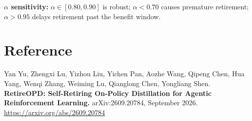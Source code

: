 \documentclass[10pt,twocolumn]{article}
\begin{document}
\textbf{$\alpha$ sensitivity:} $\alpha \in [0.80, 0.90]$ is robust;
$\alpha < 0.70$ causes premature retirement; $\alpha > 0.95$ delays
retirement past the benefit window.

\section*{Reference}

Yan Yu, Zhengxi Lu, Yizhou Liu, Yichen Pan, Aozhe Wang, Qipeng Chen,
Hua Yang, Wenqi Zhang, Weiming Lu, Qianglong Chen, Yongliang Shen.
\textbf{RetireOPD: Self-Retiring On-Policy Distillation for Agentic
Reinforcement Learning.}
arXiv:2609.20784, September 2026.
\url{https://arxiv.org/abs/2609.20784}
\end{document}
